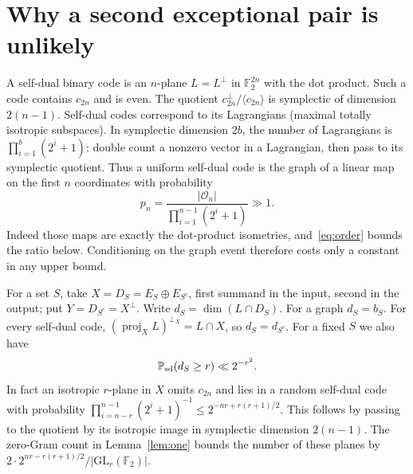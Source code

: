 \documentclass[11pt,letterpaper]{article}
\newcommand{\F}{\mathbb F_2}\newcommand{\E}{\mathbb E}\newcommand{\PP}{\mathbb P}
\newcommand{\GL}{\mathrm{GL}}\newcommand{\nul}{\operatorname{null}}
\newcommand{\rgp}{\mathcal O}
\begin{document}
\section{Why a second exceptional pair is unlikely}
A self-dual binary code is an $n$-plane $L=L^\perp$ in $\F^{2n}$ with the dot product. Such a code contains $c_{2n}$ and is even. The quotient $c_{2n}^\perp/\langle c_{2n}\rangle$ is symplectic of dimension $2(n-1)$. Self-dual codes correspond to its Lagrangians (maximal totally isotropic subspaces). In symplectic dimension $2b$, the number of Lagrangians is $\prod_{i=1}^b(2^i+1)$: double count a nonzero vector in a Lagrangian, then pass to its symplectic quotient. Thus a uniform self-dual code is the graph of a linear map on the first $n$ coordinates with probability
\[
 p_n=\frac{|\rgp_n|}{\prod_{i=1}^{n-1}(2^i+1)}\gg1.
\]
Indeed those maps are exactly the dot-product isometries, and~\eqref{eq:order} bounds the ratio below. Conditioning on the graph event therefore costs only a constant in any upper bound.

For a set $S$, take $X=D_S=E_S\oplus E_{S^c}$, first summand in the input, second in the output; put $Y=D_{S^c}=X^\perp$. Write $d_S=\dim(L\cap D_S)$. For a graph $d_S=b_S$. For every self-dual code, $(\operatorname{proj}_X L)^{\perp_X}=L\cap X$, so $d_S=d_{S^c}$. For a fixed $S$ we also have
\begin{equation}\label{eq:sdone}
 \PP_{\rm sd}(d_S\ge r)\ll 2^{-r^2}.
\end{equation}
In fact an isotropic $r$-plane in $X$ omits $c_{2n}$ and lies in a random self-dual code with probability $\prod_{i=n-r}^{n-1}(2^i+1)^{-1}\le2^{-nr+r(r+1)/2}$. This follows by passing to the quotient by its isotropic image in symplectic dimension $2(n-1)$. The zero-Gram count in Lemma~\ref{lem:one} bounds the number of these planes by $2\cdot2^{nr-r(r+1)/2}/|\GL_r(\F)|$.
\end{document}
